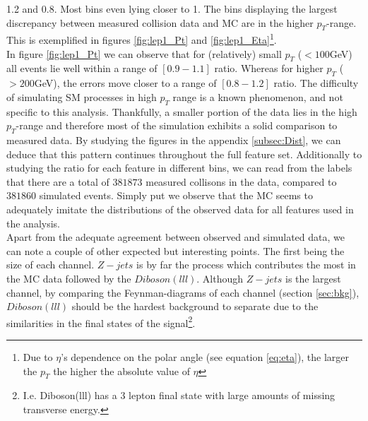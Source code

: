 1.2 and 0.8. Most bins even lying closer to 1. The bins displaying the largest discrepancy between measured collision data and \ac{MC} are 
in the higher $p_T$-range. This is exemplified in figures \ref{fig:lep1_Pt} and \ref{fig:lep1_Eta}\footnote{Due to $\eta$'s dependence on the
polar angle (see equation \ref{eq:eta}), the larger the $p_T$ the higher the absolute value of $\eta$}. 
\\
In figure \ref{fig:lep1_Pt} we can observe that for (relatively) small $p_T$ ($<100$GeV) all events lie well within a range of $[0.9-1.1]$ ratio. 
Whereas for higher $p_T$ ($>200$GeV), the errors move closer to a range of $[0.8-1.2]$ ratio. The difficulty of simulating \ac{SM} processes 
in high $p_T$ range is a known phenomenon, and not specific to this analysis. Thankfully, a smaller portion of the data lies in the high $p_T$-range
and therefore most of the simulation exhibits a solid comparison to measured data. By studying the figures in the appendix \ref{subsec:Dist}, 
we can deduce that this pattern continues throughout the full feature set. Additionally to studying the ratio for each feature in different bins,
we can read from the labels that there are a total of $381873$ measured collisons in the data, compared to $381860$ simulated events.
Simply put we observe that the \ac{MC} seems to adequately imitate the distributions of the observed data for all features used in the analysis. 
\\
Apart from the adequate agreement between observed and simulated data, we can note a couple of other expected
but interesting points. The first being the size of each channel. $Z-jets$ is by far the process which contributes the most in the \ac{MC} data
followed by the $Diboson (lll)$. Although $Z-jets$ is the largest channel, by comparing the Feynman-diagrams of each channel
(section \ref{sec:bkg}), $Diboson(lll)$ should be the hardest background to separate due to the similarities in the 
final states of the signal\footnote{I.e. Diboson(lll) has a 3 lepton final state with large amounts of missing transverse energy.}. 
